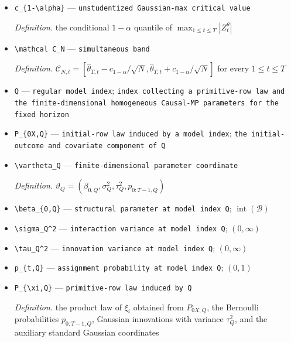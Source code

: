 \documentclass{article}
\begin{document}
\begin{itemize}
  \item \texttt{c\_\allowbreak{}\{1-\allowbreak{}\textbackslash{}\allowbreak{}alpha\}\allowbreak{}} --- \texttt{unstudentized Gaussian-\allowbreak{}max critical value}
  \par\smallskip\noindent\emph{Definition.} the conditional \(1-\alpha\) quantile of \(\max_{1\le t\le T}|Z_t^\theta|\)
  \item \texttt{\textbackslash{}\allowbreak{}mathcal C\_\allowbreak{}N} --- \texttt{simultaneous band}
  \par\smallskip\noindent\emph{Definition.} \(\mathcal C_{N,t}=[\widehat\theta_{T,t}-c_{1-\alpha}/\sqrt N,\widehat\theta_{T,t}+c_{1-\alpha}/\sqrt N]\) for every \(1\le t\le T\)
  \item \texttt{Q} --- \texttt{regular model index}; \texttt{index collecting a primitive-\allowbreak{}row law and the finite-\allowbreak{}dimensional homogeneous Causal-\allowbreak{}MP parameters for the fixed horizon}
  \item \texttt{P\_\allowbreak{}\{0X,\allowbreak{}Q\}\allowbreak{}} --- \texttt{initial-\allowbreak{}row law induced by a model index}; \texttt{the initial-\allowbreak{}outcome and covariate component of Q}
  \item \texttt{\textbackslash{}\allowbreak{}vartheta\_\allowbreak{}Q} --- \texttt{finite-\allowbreak{}dimensional parameter coordinate}
  \par\smallskip\noindent\emph{Definition.} \(\vartheta_Q=(\beta_{0,Q},\sigma_Q^2,\tau_Q^2,p_{0:T-1,Q})\)
  \item \texttt{\textbackslash{}\allowbreak{}beta\_\allowbreak{}\{0,\allowbreak{}Q\}\allowbreak{}} --- \texttt{structural parameter at model index Q}; \(\operatorname{int}(\mathcal B)\)
  \item \texttt{\textbackslash{}\allowbreak{}sigma\_\allowbreak{}Q\textasciicircum{}2} --- \texttt{interaction variance at model index Q}; \((0,\infty)\)
  \item \texttt{\textbackslash{}\allowbreak{}tau\_\allowbreak{}Q\textasciicircum{}2} --- \texttt{innovation variance at model index Q}; \((0,\infty)\)
  \item \texttt{p\_\allowbreak{}\{t,\allowbreak{}Q\}\allowbreak{}} --- \texttt{assignment probability at model index Q}; \((0,1)\)
  \item \texttt{P\_\allowbreak{}\{\textbackslash{}\allowbreak{}xi,\allowbreak{}Q\}\allowbreak{}} --- \texttt{primitive-\allowbreak{}row law induced by Q}
  \par\smallskip\noindent\emph{Definition.} the product law of \(\xi_i\) obtained from \(P_{0X,Q}\), the Bernoulli probabilities \(p_{0:T-1,Q}\), Gaussian innovations with variance \(\tau_Q^2\), and the auxiliary standard Gaussian coordinates

\end{itemize}
\end{document}
